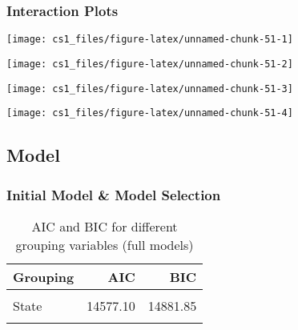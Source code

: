 \documentclass[
  11pt,
]{article}
\begin{document}
\hypertarget{interaction-plots}{%
\subsubsection{Interaction Plots}\label{interaction-plots}}

\begin{center}\texttt{[image: cs1\_files/figure-latex/unnamed-chunk-51-1]} \end{center}

\begin{center}\texttt{[image: cs1\_files/figure-latex/unnamed-chunk-51-2]} \end{center}

\begin{center}\texttt{[image: cs1\_files/figure-latex/unnamed-chunk-51-3]} \end{center}

\begin{center}\texttt{[image: cs1\_files/figure-latex/unnamed-chunk-51-4]} \end{center}

\hypertarget{model-1}{%
\subsection{Model}\label{model-1}}

\hypertarget{initial-model-model-selection-1}{%
\subsubsection{Initial Model \& Model
Selection}\label{initial-model-model-selection-1}}

\begin{table}[!h]

\caption{\label{tab:unnamed-chunk-52}AIC and BIC for different grouping variables (full models)}
\centering
\begin{tabular}[t]{l|r|r}
\hline
Grouping & AIC & BIC\\
\hline
\cellcolor{gray!6}{City} & \cellcolor{gray!6}{14627.21} & \cellcolor{gray!6}{14931.96}\\
\hline
State & 14577.10 & 14881.85\\
\hline
\cellcolor{gray!6}{Region} & \cellcolor{gray!6}{14610.16} & \cellcolor{gray!6}{14914.91}\\
\hline
\end{tabular}
\end{table}
\end{document}
